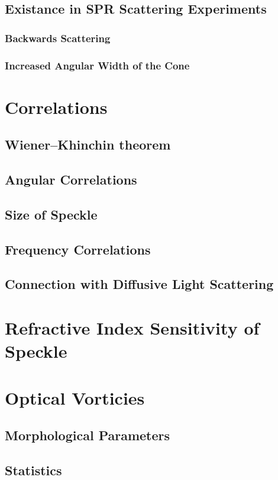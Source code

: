 \documentclass[a4paper,titlepage,onecolumn]{report}
\begin{document}
  \subsection{Existance in SPR Scattering Experiments}
   \subsubsection{Backwards Scattering}
   \subsubsection{Increased Angular Width of the Cone}
 \section{Correlations}
  \subsection{Wiener–Khinchin theorem}
  \subsection{Angular Correlations}
  \subsection{Size of Speckle}
  \subsection{Frequency Correlations}
  \subsection{Connection with Diffusive Light Scattering}
 \section{Refractive Index Sensitivity of Speckle}
 \section{Optical Vorticies}
  \subsection{Morphological Parameters}
  \subsection{Statistics}
\end{document}
